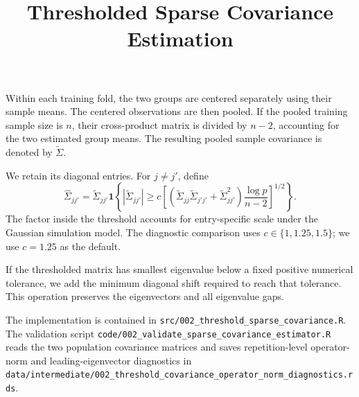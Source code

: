 \documentclass[11pt]{article}
\title{Thresholded Sparse Covariance Estimation}
\author{}
\date{}
\begin{document}
\maketitle

Within each training fold, the two groups are centered separately using their
sample means. The centered observations are then pooled. If the pooled training
sample size is $n$, their cross-product matrix is divided by $n-2$, accounting
for the two estimated group means. The resulting pooled sample covariance is
denoted by $\widetilde\Sigma$.

We retain its diagonal entries. For $j\neq j'$, define
\[
\widehat\Sigma_{jj'}
=
\widetilde\Sigma_{jj'}
\mathbf 1
\left\{
|\widetilde\Sigma_{jj'}|
\geq
c\left[
\left(
\widetilde\Sigma_{jj}\widetilde\Sigma_{j'j'}
+\widetilde\Sigma_{jj'}^2
\right)
\frac{\log p}{n-2}
\right]^{1/2}
\right\}.
\]
The factor inside the threshold accounts for entry-specific scale under the
Gaussian simulation model. The diagnostic comparison uses
$c\in\{1,1.25,1.5\}$; we use $c=1.25$ as the default.

If the thresholded matrix has smallest eigenvalue below a fixed positive
numerical tolerance, we add the minimum diagonal shift required to reach that
tolerance. This operation preserves the eigenvectors and all eigenvalue gaps.

The implementation is contained in
\texttt{src/002\_threshold\_sparse\_covariance.R}. The validation script
\texttt{code/002\_validate\_sparse\_covariance\_estimator.R} reads the two
population covariance matrices and saves repetition-level operator-norm and
leading-eigenvector diagnostics in
\texttt{data/intermediate/002\_threshold\_covariance\_operator\_norm\_diagnostics.rds}.
\end{document}
